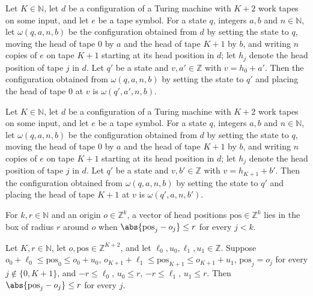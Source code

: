 \begin{lemma}
\label{Turing.cw_cfg_move₀}
\leanok
{}
Let $K\in\mathbb{N}$, let $d$ be a configuration of a Turing machine with $K+2$ work tapes on
some input, and let $e$ be a tape symbol. For a state $q$, integers $a,b$ and $n\in\mathbb{N}$,
let $\omega(q,a,n,b)$ be the configuration obtained from $d$ by setting the state to $q$,
moving the head of tape $0$ by $a$ and the head of tape $K+1$ by $b$, and writing $n$ copies of
$e$ on tape $K+1$ starting at its head position in $d$; let $h_j$ denote the head position of
tape $j$ in $d$. Let $q'$ be a state and $v,a'\in\mathbb{Z}$ with $v=h_0+a'$. Then the
configuration obtained from $\omega(q,a,n,b)$ by setting the state to $q'$ and placing the head
of tape $0$ at $v$ is $\omega(q',a',n,b)$.
\end{lemma}

\begin{lemma}
\label{Turing.cw_cfg_moveL}
\leanok
{}
Let $K\in\mathbb{N}$, let $d$ be a configuration of a Turing machine with $K+2$ work tapes on
some input, and let $e$ be a tape symbol. For a state $q$, integers $a,b$ and $n\in\mathbb{N}$,
let $\omega(q,a,n,b)$ be the configuration obtained from $d$ by setting the state to $q$,
moving the head of tape $0$ by $a$ and the head of tape $K+1$ by $b$, and writing $n$ copies of
$e$ on tape $K+1$ starting at its head position in $d$; let $h_j$ denote the head position of
tape $j$ in $d$. Let $q'$ be a state and $v,b'\in\mathbb{Z}$ with $v=h_{K+1}+b'$. Then the
configuration obtained from $\omega(q,a,n,b)$ by setting the state to $q'$ and placing the head
of tape $K+1$ at $v$ is $\omega(q',a,n,b')$.
\end{lemma}

\begin{definition}
\label{Turing.cw_box}
\leanok
For $k,r\in\mathbb{N}$ and an origin $o\in\mathbb{Z}^k$, a vector of head positions
$\mathrm{pos}\in\mathbb{Z}^k$ lies in the box of radius $r$ around $o$ when
$\abs{\mathrm{pos}_j-o_j}\le r$ for every $j<k$.
\end{definition}

\begin{lemma}
\label{Turing.cw_box_of}
\leanok
{}
Let $K,r\in\mathbb{N}$, let $o,\mathrm{pos}\in\mathbb{Z}^{K+2}$, and let
$\ell_0,u_0,\ell_1,u_1\in\mathbb{Z}$. Suppose $o_0+\ell_0\le \mathrm{pos}_0\le o_0+u_0$,
$o_{K+1}+\ell_1\le\mathrm{pos}_{K+1}\le o_{K+1}+u_1$, $\mathrm{pos}_j=o_j$ for every
$j\notin\{0,K+1\}$, and $-r\le\ell_0$, $u_0\le r$, $-r\le\ell_1$, $u_1\le r$. Then
$\abs{\mathrm{pos}_j-o_j}\le r$ for every $j$.
\end{lemma}

